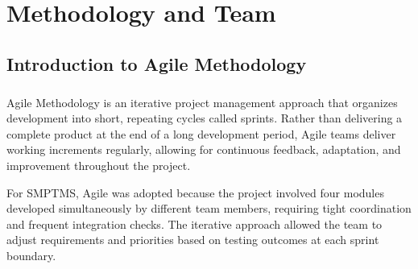\chapter{Methodology and Team}
\section{Introduction to Agile Methodology}
\paragraph{}
Agile Methodology is an iterative project management approach that organizes development into short, repeating cycles called sprints. Rather than delivering a complete product at the end of a long development period, Agile teams deliver working increments regularly, allowing for continuous feedback, adaptation, and improvement throughout the project.

For SMPTMS, Agile was adopted because the project involved four modules developed simultaneously by different team members, requiring tight coordination and frequent integration checks. The iterative approach allowed the team to adjust requirements and priorities based on testing outcomes at each sprint boundary.

